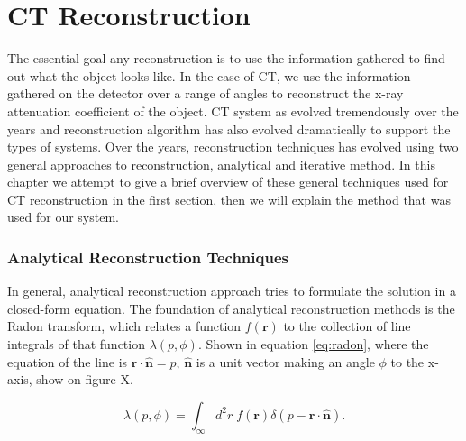 \chapter{CT Reconstruction}
The essential goal any reconstruction is to use the information gathered to find out what the object looks like.  In the case of CT, we use the information gathered on the detector over a range of angles to reconstruct the x-ray attenuation coefficient of the object.  CT system as evolved tremendously over the years and reconstruction algorithm has also evolved dramatically to support the types of systems. Over the years, reconstruction techniques has evolved using two general approaches to reconstruction, analytical and iterative method.  In this chapter we attempt to give a brief overview of these general techniques used for CT reconstruction in the first section, then we will explain the method that was used for our system.

\subsection{Analytical Reconstruction Techniques}
In general, analytical reconstruction approach tries to formulate the solution in a closed-form equation.  The foundation of analytical reconstruction methods is the Radon transform, which relates a function $f(\mathbf{r})$ to the collection of line integrals of that function $\lambda(p, \phi)$.  Shown in equation \ref{eq:radon}, where the equation of the line is $\mathbf{r \cdot \hat{n}} = p$, $\mathbf{\hat{n}}$ is a unit vector making an angle $\phi$ to the x-axis, show on figure X.

\begin{equation}
\lambda(p, \phi) = \int_\infty d^2r \; f(\mathbf{r}) \delta(p- \mathbf{r} \cdot \mathbf{\hat{n}}).
\label{eq:radon}
\end{equation}

